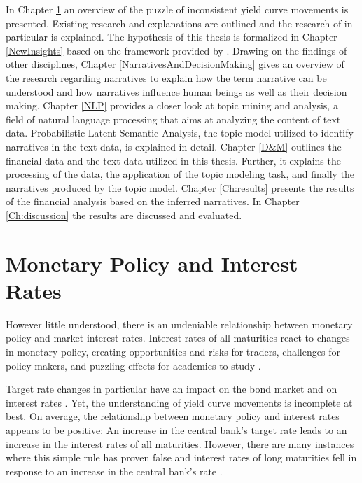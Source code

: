 \documentclass[11pt,a4paper,english,oneside]{book}
\numberwithin{equation}{chapter}
\begin{document}
In Chapter \ref{MonetaryPolicy} an overview of the puzzle of inconsistent yield curve movements is presented. Existing research and explanations are outlined and the research of \citet{Ellingsen.2003} in particular is explained. The hypothesis of this thesis is formalized in Chapter \ref{NewInsights} based on the framework provided by \citet{Ellingsen.2003}.
Drawing on the findings of other disciplines, Chapter \ref{NarrativesAndDecisionMaking} gives an overview of the research regarding narratives to explain how the term narrative can be understood and how narratives influence human beings as well as their decision making.
Chapter \ref{NLP} provides a closer look at topic mining and analysis, a field of natural language
processing that aims at analyzing the content of text data. Probabilistic Latent Semantic Analysis, the topic model utilized to identify narratives in the text data, is explained in detail. 
Chapter \ref{D&M} outlines the financial data and the text data utilized in this thesis. Further, it explains the processing of the data, the application of the topic modeling task, and finally the narratives produced by the topic model. 
Chapter \ref{Ch:results} presents the results of the financial analysis based on the inferred narratives. In Chapter \ref{Ch:discussion} the results are discussed and evaluated.



\chapter{Monetary Policy and Interest Rates} \label{MonetaryPolicy}
 
\noindent However little understood, there is an undeniable relationship between monetary policy and market interest rates. Interest rates of all maturities react to changes in monetary policy, creating opportunities and risks for traders, challenges for policy makers, and puzzling effects for academics to study \citep[p. 1594]{Ellingsen.2001}. 

Target rate changes in particular have an impact on the bond market and on interest rates \citep[p. 332]{Cook.1989}. %
Yet, the understanding of yield curve movements is incomplete at best. On average, the relationship between monetary policy and interest rates appears to be positive: An increase in the central bank's target rate leads to an increase in the interest rates of all maturities. However, there are many instances where this simple rule has proven false and interest rates of long maturities fell in response to an increase in the central bank's rate \citep[p. 1594]{Ellingsen.2001}. 
\end{document}
